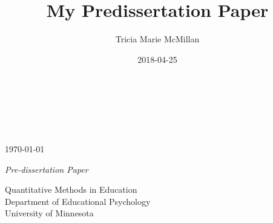 \documentclass[12pt,letterpaper,oneside,oldfontcommands]{memoir}
\title{My Predissertation Paper}
\author{Tricia Marie McMillan}
\date{2018-04-25}
\theoremstyle{definition}
\theoremstyle{definition}
\theoremstyle{definition}
\theoremstyle{remark}
\begin{document}
\maketitle

\pagestyle{empty}




\begin{center}
{\Huge \textcolor{smartblue}{{\textsc{\MakeTextUppercase{{\thetitle}}}}}\\}


\vskip 1in
{\LARGE {}}\\
\vskip 0.75in
\theauthor \\
\monthyeardate\today

\vskip 0.75in
\textit{Pre-dissertation Paper} \\

\vskip 0.75in

Quantitative Methods in Education \\[2ex]
Department of Educational Psychology \\[-1.5ex]
University of Minnesota

\vfill

\end{center}

\makeatletter




\clearpage

\begin{abstract}

\begingroup
\obeylines
%
\endgroup%

\end{abstract}



\end{document}
